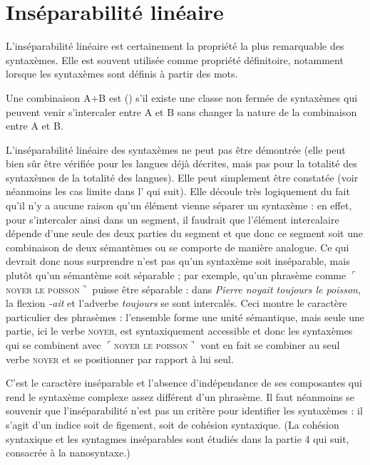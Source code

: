 \section{Inséparabilité linéaire}\label{sec:3.1.15}

L’inséparabilité linéaire est certainement la propriété la plus remarquable des syntaxèmes. Elle est souvent utilisée comme propriété définitoire, notamment lorsque les syntaxèmes sont définis à partir des mots.

\begin{styleLivreImportant}
Une combinaison A+B est ()  s’il existe une classe non fermée de syntaxèmes qui peuvent venir s’intercaler entre A et B sans changer la nature de la combinaison entre A et B.
\end{styleLivreImportant}

L’inséparabilité linéaire des syntaxèmes ne peut pas être démontrée (elle peut bien sûr être vérifiée pour les langues déjà décrites, mais pas pour la totalité des syntaxèmes de la totalité des langues). Elle peut simplement être constatée (voir néanmoins les cas limite dans l’ qui suit). Elle découle très logiquement du fait qu’il n’y a aucune raison qu’un élément vienne séparer un syntaxème : en effet, pour s’intercaler ainsi dans un segment, il faudrait que l’élément intercalaire dépende d’une seule des deux parties du segment et que donc ce segment soit une combinaison de deux sémantèmes ou se comporte de manière analogue. Ce qui devrait donc nous surprendre n’est pas qu’un syntaxème soit inséparable, mais plutôt qu’un sémantème soit séparable ; par exemple, qu’un phrasème comme $⌜$\textsc{noyer} \textsc{le} \textsc{poisson}$⌝$ puisse être séparable : dans \textit{Pierre noyait toujours le poisson}, la flexion \textit{{}-ait} et l’adverbe \textit{toujours} se sont intercalés. Ceci montre le caractère particulier des phrasèmes : l’ensemble forme une unité sémantique, mais seule une partie, ici le verbe \textsc{noyer}, est syntaxiquement accessible et donc les syntaxèmes qui se combinent avec $⌜$\textsc{noyer} \textsc{le} \textsc{poisson}$⌝$ vont en fait se combiner au seul verbe \textsc{noyer} et se positionner par rapport à lui seul.

C’est le caractère inséparable et l’absence d’indépendance de ses composantes qui rend le syntaxème complexe assez différent d’un phrasème. Il faut néanmoins se souvenir que l’inséparabilité n’est pas un critère pour identifier les syntaxèmes : il s’agit d’un indice soit de figement, soit de cohésion syntaxique. (La cohésion syntaxique et les syntagmes inséparables sont étudiés dans la partie 4 qui suit, consacrée à la nanosyntaxe.)

